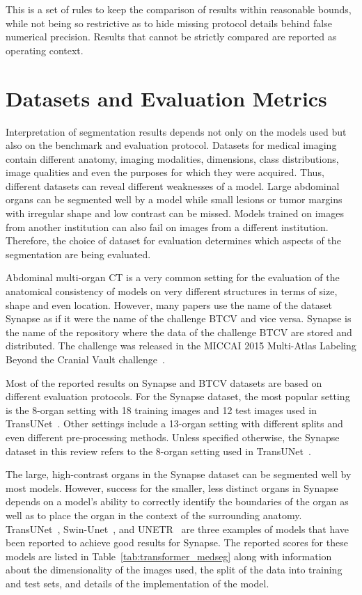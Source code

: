 \documentclass[5p,times,authoryear]{elsarticle}
\begin{document}
This is a set of rules to keep the comparison of results within reasonable bounds, while not being so restrictive as to hide missing protocol details behind false numerical precision. Results that cannot be strictly compared are reported as operating context.




\section{Datasets and Evaluation Metrics}

Interpretation of segmentation results depends not only on the models used but also on the benchmark and evaluation protocol. Datasets for medical imaging contain different anatomy, imaging modalities, dimensions, class distributions, image qualities and even the purposes for which they were acquired. Thus, different datasets can reveal different weaknesses of a model. Large abdominal organs can be segmented well by a model while small lesions or tumor margins with irregular shape and low contrast can be missed. Models trained on images from another institution can also fail on images from a different institution. Therefore, the choice of dataset for evaluation determines which aspects of the segmentation are being evaluated.

Abdominal multi-organ CT is a very common setting for the evaluation of the anatomical consistency of models on very different structures in terms of size, shape and even location. However, many papers use the name of the dataset Synapse as if it were the name of the challenge BTCV and vice versa. Synapse is the name of the repository where the data of the challenge BTCV are stored and distributed. The challenge was released in the MICCAI 2015 Multi-Atlas Labeling Beyond the Cranial Vault challenge~\citep{landman2015miccai}.

Most of the reported results on Synapse and BTCV datasets are based on different evaluation protocols. For the Synapse dataset, the most popular setting is the 8-organ setting with 18 training images and 12 test images used in TransUNet~\citep{chen2021transunet}. Other settings include a 13-organ setting with different splits and even different pre-processing methods. Unless specified otherwise, the Synapse dataset in this review refers to the 8-organ setting used in TransUNet~\citep{chen2021transunet}.

The large, high-contrast organs in the Synapse dataset can be segmented well by most models. However, success for the smaller, less distinct organs in Synapse depends on a model’s ability to correctly identify the boundaries of the organ as well as to place the organ in the context of the surrounding anatomy. TransUNet~\citep{chen2021transunet}, Swin-Unet~\citep{cao2022swinunet}, and UNETR~\citep{hatamizadeh2022unetr} are three examples of models that have been reported to achieve good results for Synapse. The reported scores for these models are listed in Table~\ref{tab:transformer_medseg} along with information about the dimensionality of the images used, the split of the data into training and test sets, and details of the implementation of the model.
\end{document}
